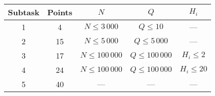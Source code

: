 
\newcommand{\gt}{\textgreater} 
\newcommand{\lt}{\textless} 


\begin{center}
\renewcommand{\arraystretch}{1.5}
\begin{tabular}{|c|c|c|c|c|}
\hline
Subtask & Points & $N$ & $Q$ & $H_i$ \\
\hline
1 & 4 & $N \le 3\,000$ & $Q\le 10$ & --- \\
\hline
2 & 15 & $N \le 5\,000$ & $Q\le 5\,000$ & --- \\
\hline
3 & 17 & $N \le 100\,000$ & $Q\le 100\,000$ & $H_i \le 2$ \\
\hline
4 & 24 & $N \le 100\,000$ & $Q\le 100\,000$ & $H_i \le 20$ \\
\hline
5 & 40 & --- & --- & --- \\
\hline
\end{tabular}
\end{center}





